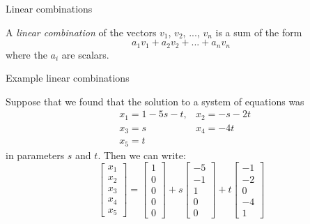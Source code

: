 \documentclass{beamer}
\begin{document}
\begin{frame}{Linear combinations}
  \begin{definition}
    A \emph{linear combination} of the vectors $v_1$, $v_2$, ..., $v_n$ is a sum of the form
    \begin{equation*}
      a_1v_1+a_2v_2+...+a_nv_n
    \end{equation*}
    where the $a_i$ are scalars.
  \end{definition}
\end{frame}

\begin{frame}{Example linear combinations}
  \begin{example}
    Suppose that we found that the solution to a system of equations was
    \begin{align*}
      &x_1 = 1-5s-t, & x_2 = -s-2t\\
      &x_3 = s & x_4 = -4t\\
      &x_5 = t
    \end{align*}
    in parameters $s$ and $t$.
    Then we can write:
    \begin{equation*}
      \left[\begin{array}{r}
              x_1\\
              x_2\\
              x_3\\
              x_4\\
              x_5
      \end{array}\right] = 
      \left[\begin{array}{r}
              1\\
              0\\
              0\\
              0\\
              0
      \end{array}\right]+s
      \left[\begin{array}{r}
        -5\\
        -1\\
              1\\
              0\\
              0
      \end{array}\right]+t
      \left[\begin{array}{r}
        -1\\
              -2\\
              0\\
              -4\\
              1
      \end{array}\right]
    \end{equation*}
  \end{example}
\end{frame}
\end{document}
